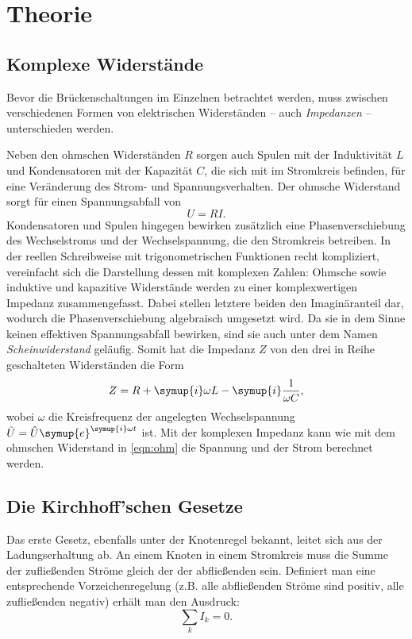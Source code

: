 \section{Theorie}
\label{sec:Theorie}
\subsection{Komplexe Widerstände}
Bevor die Brückenschaltungen im Einzelnen betrachtet werden, muss zwischen verschiedenen Formen von elektrischen Widerständen -- 
auch \textit{Impedanzen} -- unterschieden werden. 

Neben den ohmschen Widerständen $R$ sorgen auch Spulen mit der Induktivität $L$ und Kondensatoren mit der Kapazität $C$, 
die sich mit im Stromkreis befinden, für eine Veränderung des Strom- und Spannungsverhalten. 
Der ohmsche Widerstand sorgt für einen Spannungsabfall von 
\begin{equation}
    U=RI .
    \label{eqn:ohm}
\end{equation}
Kondensatoren und Spulen hingegen bewirken zusätzlich eine Phasenverschiebung des Wechselstroms und der Wechselspannung,
die den Stromkreis betreiben. 
In der reellen Schreibweise mit trigonometrischen Funktionen recht kompliziert, vereinfacht sich die Darstellung dessen 
mit komplexen Zahlen: 
Ohmsche sowie induktive und kapazitive Widerstände werden zu einer komplexwertigen Impedanz zusammengefasst. 
Dabei stellen letztere beiden den Imaginäranteil dar, wodurch die Phasenverschiebung algebraisch umgesetzt wird. 
Da sie in dem Sinne keinen effektiven Spannungsabfall bewirken, sind sie auch unter dem Namen \textit{Scheinwiderstand} geläufig.
Somit hat die Impedanz $Z$ von den drei in Reihe geschalteten Widerständen die Form 
\begin{equation}
    Z = R + \symup{i}\omega L - \symup{i}\frac{1}{\omega C} ,
    \label{eqn:impedanz}
\end{equation}
wobei $\omega$ die Kreisfrequenz der angelegten Wechselspannung $\tilde{U} = \hat{U} \symup{e}^{\symup{i}\omega t}$ ist.
Mit der komplexen Impedanz kann wie mit dem ohmschen Widerstand in \eqref{eqn:ohm} die Spannung und der Strom berechnet werden. 

\subsection{Die Kirchhoff'schen Gesetze}
Das erste Gesetz, ebenfalls unter der Knotenregel bekannt, leitet sich aus der Ladungserhaltung ab. 
An einem Knoten in einem Stromkreis muss die Summe der zufließenden Ströme gleich der der abfließenden sein. 
Definiert man eine entsprechende Vorzeichenregelung (z.B. alle abfließenden Ströme sind positiv, alle zufließenden negativ) 
erhält man den Ausdruck: 
\begin{equation}
    \sum_k I_k=0 .
    \label{eqn:kirchhoff1}
\end{equation}

